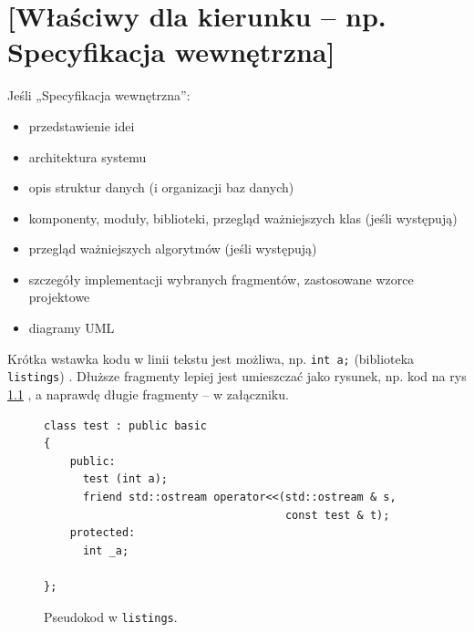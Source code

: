 \documentclass[a4paper,twoside,12pt]{book}
\begin{document}
\chapter{[Właściwy dla kierunku -- np. Specyfikacja wewnętrzna]}
\label{ch:05}

Jeśli „Specyfikacja wewnętrzna”:
\begin{itemize}
\item przedstawienie idei
\item architektura systemu
\item opis struktur danych (i organizacji baz danych)
\item komponenty, moduły, biblioteki, przegląd ważniejszych klas (jeśli występują)
\item przegląd ważniejszych algorytmów (jeśli występują)
\item szczegóły implementacji wybranych fragmentów, zastosowane wzorce projektowe
\item diagramy UML
\end{itemize}



Krótka wstawka kodu w linii tekstu jest możliwa, np.  \lstinline|int a;| (biblioteka \texttt{listings})%
. 
Dłuższe fragmenty lepiej jest umieszczać jako rysunek, np. kod na rys \ref{fig:pseudokod:listings}%
, a naprawdę długie fragmenty – w załączniku.


\begin{figure}[H]
\begin{lstlisting}
class test : public basic
{
    public:
      test (int a);
      friend std::ostream operator<<(std::ostream & s, 
                                     const test & t);
    protected:
      int _a;  
      
};
\end{lstlisting}
\caption{Pseudokod w \texttt{listings}.}
\label{fig:pseudokod:listings}
\end{figure}

%      
\end{document}
